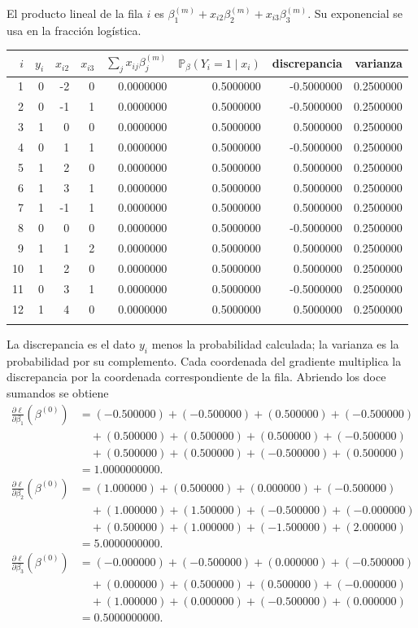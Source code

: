 \documentclass[11pt,a4paper]{article}
\newcommand{\Prob}{\mathbb P}
\begin{document}
El producto lineal de la fila \(i\) es
\(\beta_1^{(m)}+x_{i2}\beta_2^{(m)}+x_{i3}\beta_3^{(m)}\).
Su exponencial se usa en la fracción logística.
\begin{center}\scriptsize
\begin{tabular}{rrrrrrrr}\toprule
\(i\)&\(y_i\)&\(x_{i2}\)&\(x_{i3}\)&\(\sum_jx_{ij}\beta_j^{(m)}\)&\(\Prob_\beta(Y_i=1\mid x_i)\)&discrepancia&varianza\\\midrule
1&0&-2&0&0.0000000&0.5000000&-0.5000000&0.2500000\\
2&0&-1&1&0.0000000&0.5000000&-0.5000000&0.2500000\\
3&1&0&0&0.0000000&0.5000000&0.5000000&0.2500000\\
4&0&1&1&0.0000000&0.5000000&-0.5000000&0.2500000\\
5&1&2&0&0.0000000&0.5000000&0.5000000&0.2500000\\
6&1&3&1&0.0000000&0.5000000&0.5000000&0.2500000\\
7&1&-1&1&0.0000000&0.5000000&0.5000000&0.2500000\\
8&0&0&0&0.0000000&0.5000000&-0.5000000&0.2500000\\
9&1&1&2&0.0000000&0.5000000&0.5000000&0.2500000\\
10&1&2&0&0.0000000&0.5000000&0.5000000&0.2500000\\
11&0&3&1&0.0000000&0.5000000&-0.5000000&0.2500000\\
12&1&4&0&0.0000000&0.5000000&0.5000000&0.2500000\\
\\\bottomrule\end{tabular}\end{center}
La discrepancia es el dato \(y_i\) menos la probabilidad
calculada; la varianza es la probabilidad por su complemento.
Cada coordenada del gradiente multiplica la discrepancia por
la coordenada correspondiente de la fila. Abriendo los doce
sumandos se obtiene
\[
\begin{aligned}
\frac{\partial\ell}{\partial\beta_1}(\beta^{(0)})&=(-0.500000)+(-0.500000)+(0.500000)+(-0.500000)\\&\quad+(0.500000)+(0.500000)+(0.500000)+(-0.500000)\\&\quad+(0.500000)+(0.500000)+(-0.500000)+(0.500000)\\&=1.0000000000.\end{aligned}
\]
\[
\begin{aligned}
\frac{\partial\ell}{\partial\beta_2}(\beta^{(0)})&=(1.000000)+(0.500000)+(0.000000)+(-0.500000)\\&\quad+(1.000000)+(1.500000)+(-0.500000)+(-0.000000)\\&\quad+(0.500000)+(1.000000)+(-1.500000)+(2.000000)\\&=5.0000000000.\end{aligned}
\]
\[
\begin{aligned}
\frac{\partial\ell}{\partial\beta_3}(\beta^{(0)})&=(-0.000000)+(-0.500000)+(0.000000)+(-0.500000)\\&\quad+(0.000000)+(0.500000)+(0.500000)+(-0.000000)\\&\quad+(1.000000)+(0.000000)+(-0.500000)+(0.000000)\\&=0.5000000000.\end{aligned}
\]
\end{document}
